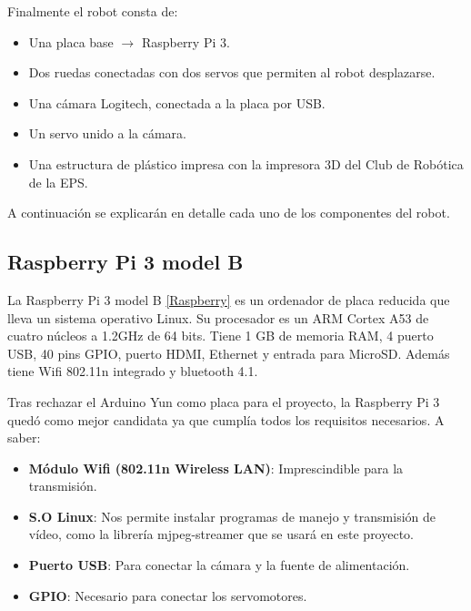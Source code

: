 \documentclass[twoside, 11pt]{epstfg}
\begin{document}
Finalmente el robot consta de:
\begin{itemize}
	\item Una placa base $\rightarrow$ Raspberry Pi 3.
	\item Dos ruedas conectadas con dos servos que permiten al robot desplazarse.
	\item Una cámara Logitech, conectada a la placa por USB.
	\item Un servo unido a la cámara.
	\item Una estructura de plástico impresa con la impresora 3D del Club de Robótica de la EPS.
\end{itemize}


A continuación se explicarán en detalle cada uno de los componentes del robot.

\subsection{Raspberry Pi 3 model B}
La Raspberry Pi 3 model B  \ref{Raspberry} es un ordenador de placa reducida que lleva un sistema operativo Linux.
Su procesador es un ARM Cortex A53 de cuatro núcleos a 1.2GHz de 64 bits.
Tiene 1 GB de memoria RAM, 4 puerto USB, 40 pins GPIO, puerto HDMI, Ethernet y entrada para MicroSD.
Además tiene Wifi 802.11n integrado y bluetooth 4.1.

Tras rechazar el Arduino Yun como placa para el proyecto, la Raspberry Pi 3 quedó como mejor candidata ya que cumplía todos los requisitos necesarios. A saber:

\begin{itemize}
	\item \textbf{Módulo Wifi (802.11n Wireless LAN)}: Imprescindible para la transmisión.
	\item \textbf{S.O Linux}: Nos permite instalar programas de manejo y transmisión de vídeo, como la librería mjpeg-streamer que se usará en este proyecto.
	\item \textbf{Puerto USB}: Para conectar la cámara y la fuente de alimentación.
	\item \textbf{GPIO}: Necesario para conectar los servomotores.
\end{itemize}
\end{document}
